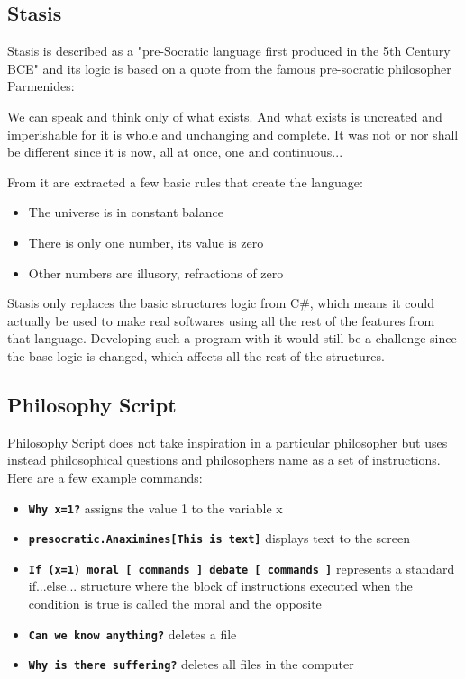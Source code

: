 \documentclass[4paper]{article}
\begin{document}
\subsection{Stasis}

Stasis is described as a "pre-Socratic language first produced in the 5th Century BCE" and its logic is based on a quote from the famous pre-socratic philosopher Parmenides:
\begin{displayquote}
We can speak and think only of what exists. And what exists is uncreated and imperishable for it is whole and unchanging and complete. It was not or nor shall be different since it is now, all at once, one and continuous...
\end{displayquote}
From it are extracted a few basic rules that create the language: 
\begin{itemize}
\item The universe is in constant balance
\item There is only one number, its value is zero
\item Other numbers are illusory, refractions of zero
\end{itemize}

Stasis only replaces the basic structures logic from C\#, which means it could actually be used to make real softwares using all the rest of the features from that language. Developing such a program with it would still be a challenge since the base logic is changed, which affects all the rest of the structures.

\subsection{Philosophy Script}

Philosophy Script does not take inspiration in a particular philosopher but uses instead philosophical questions and philosophers name as a set of instructions. Here are a few example commands:
\begin{itemize}
\item \textbf{\texttt{Why x=1?}} assigns the value 1 to the variable x
\item \textbf{\texttt{presocratic.Anaximines[This is text]}} displays text to the screen
\item \textbf{\texttt{If (x=1) moral [
commands
]
debate [
commands
]}} represents a standard if...else... structure where the block of instructions executed when the condition is true is called the moral and the opposite
\item \texttt{\textbf{Can we know anything?}} deletes a file
\item \texttt{\textbf{Why is there suffering?}} deletes all files in the computer
\end{itemize}
\end{document}
